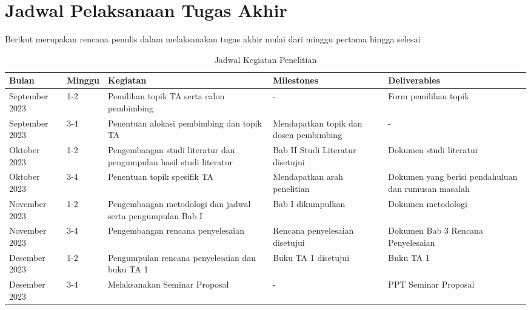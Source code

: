 \section{Jadwal Pelaksanaan Tugas Akhir}

Berikut merupakan rencana penulis dalam melaksanakan tugas akhir mulai dari minggu pertama hingga selesai

\begin{table}[ht]
  \centering
  \begin{tabular}{@{}llp{3cm}p{2.5cm}p{2.5cm}@{}}
  \hline
  Bulan        & Minggu & Kegiatan & Milestones & Deliverables \\ \hline
  September 2023 & 1-2    & Pemilihan topik TA serta calon pembimbing & - & Form pemilihan topik \\ \hline
  September 2023 & 3-4    & Penentuan alokasi pembimbing dan topik TA & Mendapatkan topik dan dosen pembimbing & - \\ \hline
  Oktober 2023   & 1-2    & Pengembangan studi literatur dan pengumpulan hasil studi literatur & Bab II Studi Literatur disetujui & Dokumen studi literatur \\ \hline
  Oktober 2023   & 3-4    & Penentuan topik spesifik TA & Mendapatkan arah penelitian & Dokumen yang berisi pendahuluan dan rumusan masalah \\ \hline
  November 2023  & 1-2    & Pengembangan metodologi dan jadwal serta pengumpulan Bab I & Bab I dikumpulkan & Dokumen metodologi \\ \hline
  November 2023  & 3-4    & Pengembangan rencana penyelesaian & Rencana penyelesaian disetujui & Dokumen Bab 3 Rencana Penyelesaian \\ \hline
  Desember 2023  & 1-2    & Pengumpulan rencana penyelesaian dan buku TA 1 & Buku TA 1 disetujui & Buku TA 1 \\ \hline
  Desember 2023  & 3-4    & Melaksanakan Seminar Proposal & - & PPT Seminar Proposal \\ \hline
  \end{tabular}
  \caption{Jadwal Kegiatan Penelitian}
  \label{tab:jadwal-kegiatan-penelitian}
\end{table}